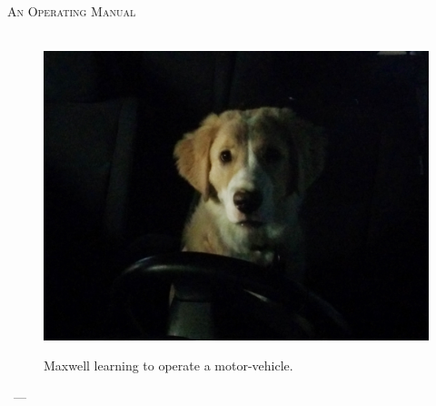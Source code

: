 \begin{titlepage}
    \begin{center}

        \textsc{\huge \thetitle}\\
        \textsc{An Operating Manual}\\[1em]
        \HRule \\[1em]

        \begin{figure}[h!]
            \centering
            \caption{Maxwell learning to operate a motor-vehicle.}
            \includegraphics[width=.75\textwidth]{./images/max/title.jpg}
            \label{fig:max_title}
        \end{figure}

        \vfill
        {
            \large \theauthor \  --- \large \thedate
        }

    \end{center}
\end{titlepage}
